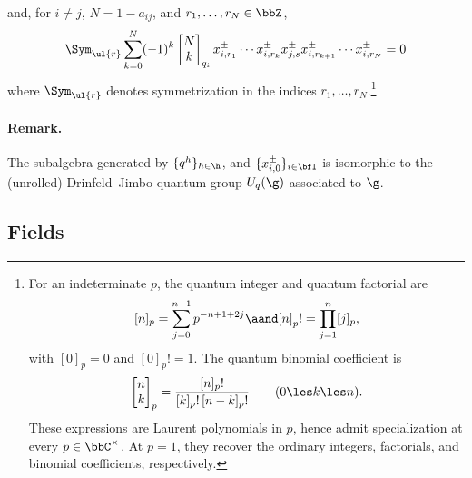 \documentclass[reqno]{amsart}
\numberwithin{equation}{section}
\newenvironment{remark}{\medskip\paragraph{{\bf Remark.}}}{\par\medskip}
\begin{document}
and, for $i\neq j$, $N=1-a_{ij}$, and $r_1,\dots, r_N\in\bbZ$,
\begin{align}
	\label{eq:QL-full-rels-serre}
	\Sym_{\ul{r}}
	\sum_{k=0}^{N}
	(-1)^k
	\begin{bmatrix}N\\ k \end{bmatrix}_{q_i}
	x^\pm_{i,r_{1}}\cdots x^\pm_{i,r_k}
	x^\pm_{j,s}
	x^\pm_{i,r_{k+1}}\cdots x^\pm_{i,r_{N}}
	=0
\end{align}
where $\Sym_{\ul{r}}$ denotes symmetrization in  the indices $r_1,\dots,r_N$.\footnote{For an indeterminate $p$, the quantum integer and quantum factorial are
\[
[n]_p=\sum_{j=0}^{n-1}p^{-n+1+2j}\aand
[n]_p!=\prod_{j=1}^{n}[j]_p,
\]
with $[0]_p=0$ and $[0]_p!=1$.
The quantum binomial coefficient is
\[
\begin{bmatrix}n\\k\end{bmatrix}_p
=\frac{[n]_p!}{[k]_p!\,[n-k]_p!}
\qquad (0\les k\les n).
\]
These expressions are Laurent polynomials in $p$, hence admit
specialization at every $p\in\bbC^\times$. At $p=1$, they recover
the ordinary integers, factorials, and binomial coefficients, respectively.}

\begin{remark}
The subalgebra generated by $\{q^h\}_{h\in\h}$, and $\{x^{\pm}_{i,0}\}_{i\in\bfI}$
is isomorphic to the (unrolled) Drinfeld--Jimbo quantum group $U_q(\g)$ associated to $\g$. 
\hfill\rmkend
\end{remark}

\subsection{Fields}\label{ss:QL-fields}
\end{document}
